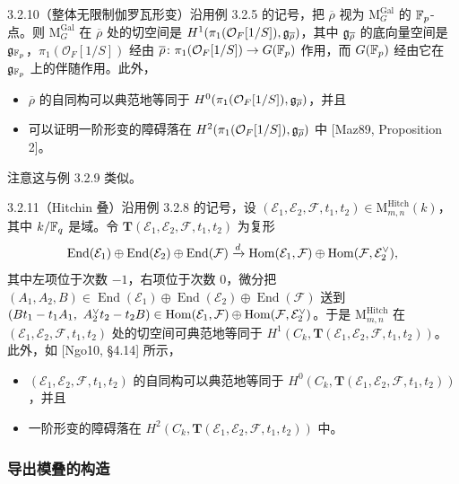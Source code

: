 \begin{exam}{3.2.10}（整体无限制伽罗瓦形变）沿用例 3.2.5 的记号，把 $\overline\rho$ 视为 $\mathrm{M}^{\mathrm{Gal}}_G$ 的 $\mathbb{F}_p$-点。则 $\mathrm{M}^{\mathrm{Gal}}_G$ 在 $\overline\rho$ 处的切空间是 $H^1(\pi_1(\mathcal O_F[1/S]),\mathfrak{g}_{\overline\rho})$，其中 $\mathfrak{g}_{\overline\rho}$ 的底向量空间是 $\mathfrak{g}_{\mathbb{F}_p}$，$\pi_1(\mathcal O_F[1/S])$ 经由 $\overline\rho\colon\pi_1(\mathcal O_F[1/S])\to G(\mathbb{F}_p)$ 作用，而 $G(\mathbb{F}_p)$ 经由它在 $\mathfrak{g}_{\mathbb{F}_p}$ 上的伴随作用。此外，
\begin{itemize}
\item $\overline\rho$ 的自同构可以典范地等同于 $H^0(\pi_1(\mathcal O_F[1/S]),\mathfrak{g}_{\overline\rho})$，并且
\item 可以证明一阶形变的障碍落在 $H^2(\pi_1(\mathcal O_F[1/S]),\mathfrak{g}_{\overline\rho})$ 中 [Maz89, Proposition 2]。
\end{itemize}
注意这与例 3.2.9 类似。
\end{exam}

\begin{exam}{3.2.11}（Hitchin 叠）沿用例 3.2.8 的记号，设 $(\mathcal E_1,\mathcal E_2,\mathcal F,t_1,t_2)\in\mathrm{M}^{\mathrm{Hitch}}_{m,n}(k)$，其中 $k/\mathbb{F}_q$ 是域。令 $\mathbf T(\mathcal E_1,\mathcal E_2,\mathcal F,t_1,t_2)$ 为复形
\[
\operatorname{End}(\mathcal E_1)\oplus\operatorname{End}(\mathcal E_2)\oplus\operatorname{End}(\mathcal F)\xrightarrow{d}\operatorname{Hom}(\mathcal E_1,\mathcal F)\oplus\operatorname{Hom}(\mathcal F,\mathcal E_2^\vee),
\]
其中左项位于次数 $-1$，右项位于次数 $0$，微分把 $(A_1,A_2,B)\in\operatorname{End}(\mathcal E_1)\oplus\operatorname{End}(\mathcal E_2)\oplus\operatorname{End}(\mathcal F)$ 送到 $(Bt_1-t_1A_1,\ A_2^\vee t_2-t_2B)\in\operatorname{Hom}(\mathcal E_1,\mathcal F)\oplus\operatorname{Hom}(\mathcal F,\mathcal E_2^\vee)$。于是 $\mathrm{M}^{\mathrm{Hitch}}_{m,n}$ 在 $(\mathcal E_1,\mathcal E_2,\mathcal F,t_1,t_2)$ 处的切空间可典范地等同于 $H^1(C_k,\mathbf T(\mathcal E_1,\mathcal E_2,\mathcal F,t_1,t_2))$。此外，如 [Ngo10, §4.14] 所示，
\begin{itemize}
\item $(\mathcal E_1,\mathcal E_2,\mathcal F,t_1,t_2)$ 的自同构可以典范地等同于 $H^0(C_k,\mathbf T(\mathcal E_1,\mathcal E_2,\mathcal F,t_1,t_2))$，并且
\item 一阶形变的障碍落在 $H^2(C_k,\mathbf T(\mathcal E_1,\mathcal E_2,\mathcal F,t_1,t_2))$ 中。
\end{itemize}
\end{exam}

\subsubsection{导出模叠的构造}

